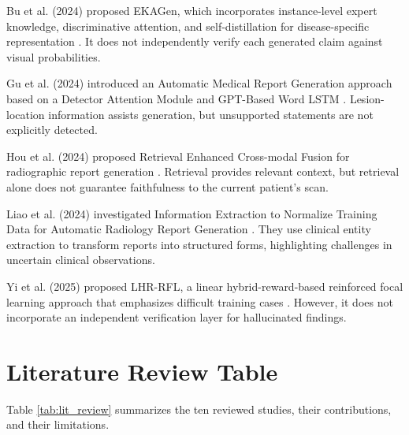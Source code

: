 \documentclass[12pt,a4paper]{report}
\begin{document}
Bu et al. (2024) proposed EKAGen, which incorporates instance-level expert knowledge, discriminative attention, and self-distillation for disease-specific representation \cite{bu2024ekagen}. It does not independently verify each generated claim against visual probabilities.

Gu et al. (2024) introduced an Automatic Medical Report Generation approach based on a Detector Attention Module and GPT-Based Word LSTM \cite{gu2024automatic}. Lesion-location information assists generation, but unsupported statements are not explicitly detected.

Hou et al. (2024) proposed Retrieval Enhanced Cross-modal Fusion for radiographic report generation \cite{hou2024retrieval}. Retrieval provides relevant context, but retrieval alone does not guarantee faithfulness to the current patient's scan.

Liao et al. (2024) investigated Information Extraction to Normalize Training Data for Automatic Radiology Report Generation \cite{liao2024information}. They use clinical entity extraction to transform reports into structured forms, highlighting challenges in uncertain clinical observations.

Yi et al. (2025) proposed LHR-RFL, a linear hybrid-reward-based reinforced focal learning approach that emphasizes difficult training cases \cite{yi2025lhr}. However, it does not incorporate an independent verification layer for hallucinated findings.

\section{Literature Review Table}
Table \ref{tab:lit_review} summarizes the ten reviewed studies, their contributions, and their limitations.
\end{document}

